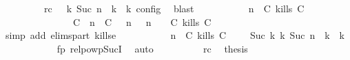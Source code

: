 \begin{isabellebody}
\ \ \ \ \ \ \ \ \ rc{\isacharcolon}{\isacartoucheopen}{\isasymrho}\ {\isasymin}\ {\isasymlbrakk}\ {\isasymGamma}\isactrlsub k{\isacharcomma}\ Suc\ n\ {\isasymturnstile}\ {\isasymPsi}\isactrlsub k\ {\isasymtriangleright}\ {\isasymPhi}\isactrlsub k\ {\isasymrbrakk}\isactrlsub c\isactrlsub o\isactrlsub n\isactrlsub f\isactrlsub i\isactrlsub g{\isacartoucheclose}\ \isamarkupfalse%
\ blast\isanewline
\ \ \ \ \ \ \ \ \isamarkupfalse%
\ {\isacartoucheopen}{\isacharparenleft}{\isasymGamma}{\isacharcomma}\ n\ {\isasymturnstile}\ {\isacharparenleft}{\isacharparenleft}C\ kills\ C\ {\isacharhash}\ {\isasymPsi}{\isacharparenright}\ {\isasymtriangleright}\ {\isasymPhi}{\isacharparenright}\isanewline
\ \ \ \ \ \ \ \ \ \ \ \ \ \ {\isasymhookrightarrow}\ {\isacharparenleft}{\isacharparenleft}{\isacharparenleft}C\ {\isasymUp}\ n{\isacharparenright}\ {\isacharhash}\ {\isacharparenleft}C\ {\isasymnot}{\isasymUp}\ {\isasymge}\ n{\isacharparenright}\ {\isacharhash}\ {\isasymGamma}{\isacharparenright}{\isacharcomma}\ n\ {\isasymturnstile}\ {\isasymPsi}\ {\isasymtriangleright}\ {\isacharparenleft}{\isacharparenleft}C\ kills\ C\ {\isacharhash}\ {\isasymPhi}{\isacharparenright}{\isacharparenright}{\isacartoucheclose}\isanewline
\ \ \ \ \ \ \ \ \ \ \isamarkupfalse%
\ {\isacharparenleft}simp\ add{\isacharcolon}\ elims{\isacharunderscore}part\ kills{\isacharunderscore}e{}{\isacharparenright}\isanewline
\ \ \ \ \ \ \ \ \isamarkupfalse%
\ {\isacartoucheopen}{\isacharparenleft}{\isasymGamma}{\isacharcomma}\ n\ {\isasymturnstile}\ {\isacharparenleft}{\isacharparenleft}C\ kills\ C\ {\isacharhash}\ {\isasymPsi}{\isacharparenright}\ {\isasymtriangleright}\ {\isasymPhi}{\isacharparenright}\ {\isasymhookrightarrow}\isactrlbsup Suc\ k\isactrlesup \ {\isacharparenleft}{\isasymGamma}\isactrlsub k{\isacharcomma}\ Suc\ n\ {\isasymturnstile}\ {\isasymPsi}\isactrlsub k\ {\isasymtriangleright}\ {\isasymPhi}\isactrlsub k{\isacharparenright}{\isacartoucheclose}\isanewline
\ \ \ \ \ \ \ \ \ \ \isamarkupfalse%
\ fp\ relpowp{\isacharunderscore}Suc{\isacharunderscore}I{}\ \isamarkupfalse%
\ auto\isanewline
\ \ \ \ \ \ \ \ \isamarkupfalse%
\ rc\ \isamarkupfalse%
\ {\isacharquery}thesis\ \isamarkupfalse%

\end{isabellebody}
